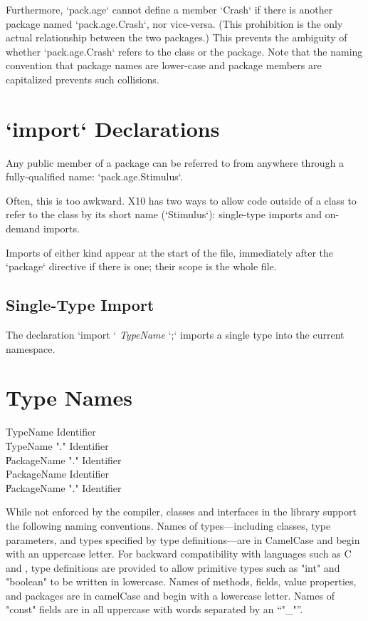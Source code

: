 Furthermore, \xcd`pack.age` cannot define a member \xcd`Crash` if there is
another package named \xcd`pack.age.Crash`, nor vice-versa. (This prohibition
is the only actual relationship between the two packages.)  This prevents the
ambiguity of whether \xcd`pack.age.Crash` refers to the class or the package.  
Note that the naming convention that package names are lower-case and package
members are capitalized prevents such collisions.


\section{\xcd`import` Declarations}

Any public member of a package can be referred to from anywhere through a
fully-qualified name: \xcd`pack.age.Stimulus`.    

Often, this is too awkward.  X10 has two ways to allow code outside of a class
to refer to the class by its short name (\xcd`Stimulus`): single-type imports
and on-demand imports.   

Imports of either kind appear at the start of the file, immediately after the
\xcd`package` directive if there is one; their scope is the whole file.

\subsection{Single-Type Import}

The declaration \xcd`import ` {\em TypeName} \xcd`;` imports a single type
into the current namespace.  




\section{Type Names}

\begin{grammar}
TypeName   \: Identifier \\
        \| TypeName \xcd"." Identifier \\
        \| PackageName \xcd"." Identifier \\
PackageName   \: Identifier \\
        \| PackageName \xcd"." Identifier \\
\end{grammar}


While not enforced by the compiler, classes and interfaces
in the \Xten{} library support the following naming conventions.
Names of types---including classes,
type
parameters, and types specified by type definitions---are in
CamelCase and begin with an uppercase letter.  For backward
compatibility with languages such as C and \java{}, type
definitions are provided to allow primitive types
such as \xcd"int" and \xcd"boolean" to be written in lowercase.
Names of methods, fields, value properties, and packages are in camelCase and begin with a lowercase letter.
Names of \xcd"const" fields are in all uppercase with words
separated by an ``\xcd"_"''.


